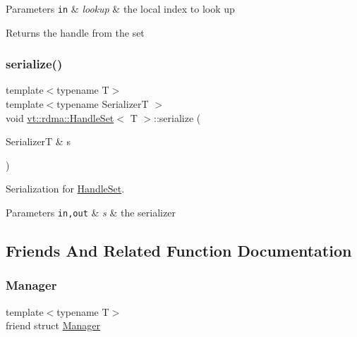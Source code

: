 \begin{DoxyParams}[1]{Parameters}
\mbox{\tt in}  & {\em lookup} & the local index to look up\\
\hline
\end{DoxyParams}
\begin{DoxyReturn}{Returns}
the handle from the set 
\end{DoxyReturn}
\mbox{\label{structvt_1_1rdma_1_1_handle_set_a4a78a0c0e54d6044676c560c00fba248}} 
\subsubsection{\texorpdfstring{serialize()}{serialize()}}
{\footnotesize\ttfamily template$<$typename T$>$ \\
template$<$typename SerializerT $>$ \\
void \hyperlink{structvt_1_1rdma_1_1_handle_set}{vt\+::rdma\+::\+Handle\+Set}$<$ T $>$\+::serialize (\begin{DoxyParamCaption}\item[{SerializerT \&}]{s }\end{DoxyParamCaption})\hspace{0.3cm}{\ttfamily [inline]}}



Serialization for {\ttfamily \hyperlink{structvt_1_1rdma_1_1_handle_set}{Handle\+Set}}. 


\begin{DoxyParams}[1]{Parameters}
\mbox{\tt in,out}  & {\em s} & the serializer \\
\hline
\end{DoxyParams}


\subsection{Friends And Related Function Documentation}
\mbox{\label{structvt_1_1rdma_1_1_handle_set_a1fd6b9bc3f72bb2b64e602de3982929d}} 
\subsubsection{\texorpdfstring{Manager}{Manager}}
{\footnotesize\ttfamily template$<$typename T$>$ \\
friend struct \hyperlink{structvt_1_1rdma_1_1_manager}{Manager}\hspace{0.3cm}{\ttfamily [friend]}}



